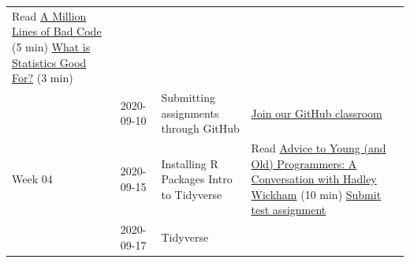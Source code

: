 \documentclass[
]{book}
\begin{document}
\begin{longtable}[]{@{}llll@{}}
\begin{minipage}[t]{0.22\columnwidth}
Read \href{http://varianceexplained.org/programming/bad-code/}{A Million Lines of Bad Code} (5 min) \href{readings/module7_eds_whats_stats.pdf}{What is Statistics Good For?} (3 min)\strut
\end{minipage}\tabularnewline
\begin{minipage}[t]{0.22\columnwidth}\raggedright
\strut
\end{minipage} & \begin{minipage}[t]{0.22\columnwidth}\raggedright
2020-09-10\strut
\end{minipage} & \begin{minipage}[t]{0.22\columnwidth}\raggedright
Submitting assignments through GitHub\strut
\end{minipage} & \begin{minipage}[t]{0.22\columnwidth}\raggedright
\href{https://classroom.github.com/a/uE1b8ho7}{Join our GitHub classroom}\strut
\end{minipage}\tabularnewline
\begin{minipage}[t]{0.22\columnwidth}\raggedright
Week 04\strut
\end{minipage} & \begin{minipage}[t]{0.22\columnwidth}\raggedright
2020-09-15\strut
\end{minipage} & \begin{minipage}[t]{0.22\columnwidth}\raggedright
Installing R Packages Intro to Tidyverse\strut
\end{minipage} & \begin{minipage}[t]{0.22\columnwidth}\raggedright
Read \href{https://www.r-bloggers.com/advice-to-young-and-old-programmers-a-conversation-with-hadley-wickham/}{Advice to Young (and Old) Programmers: A Conversation with Hadley Wickham} (10 min) \href{https://classroom.github.com/a/uE1b8ho7}{Submit test assignment}\strut
\end{minipage}\tabularnewline
\begin{minipage}[t]{0.22\columnwidth}\raggedright
\strut
\end{minipage} & \begin{minipage}[t]{0.22\columnwidth}\raggedright
2020-09-17\strut
\end{minipage} & \begin{minipage}[t]{0.22\columnwidth}\raggedright
Tidyverse\strut
\end{minipage} & \begin{minipage}[t]{0.22\columnwidth}\raggedright
\strut
\end{minipage}\tabularnewline

\end{longtable}
\end{document}
